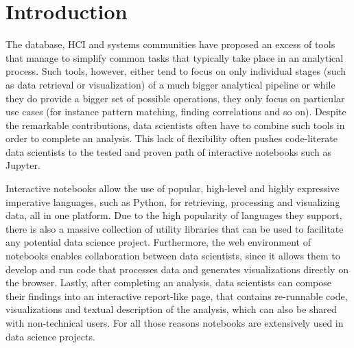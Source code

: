 \section{Introduction}
\label{section:introduction}




The database, HCI and systems communities have proposed an excess of tools that manage to simplify common tasks that typically take place in an analytical process. Such tools, however, either tend to focus on only individual stages (such as data retrieval or visualization) of a much bigger analytical pipeline or while they do provide a bigger set of possible operations, they only focus on particular use cases (for instance pattern matching, finding correlations and so on). Despite the remarkable contributions, data scientists often have to combine such tools in order to complete an analysis. This lack of flexibility often pushes code-literate data scientists to the tested and proven path of interactive notebooks such as Jupyter.

Interactive notebooks allow the use of popular, high-level and highly expressive imperative languages, such as Python, for retrieving, processing and visualizing data, all in one platform. Due to the high popularity of languages they support, there is also a massive collection of utility libraries that can be used to facilitate any potential data science project. Furthermore, the web environment of notebooks enables collaboration between data scientists, since it allows them to develop and run code that processes data and generates visualizations directly on the browser. Lastly, after completing an analysis, data scientists can compose their findings into an interactive report-like page, that contains re-runnable code, visualizations and textual description of the analysis, which can also be shared with non-technical users. For all those reasons notebooks are extensively used in data science projects.

